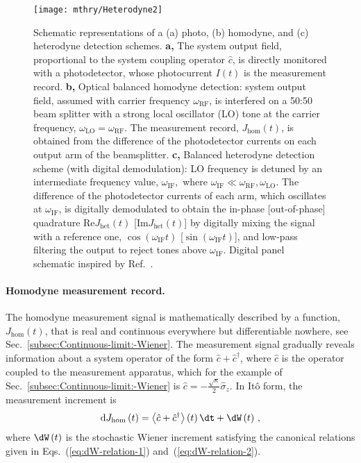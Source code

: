 \begin{figure}
\begin{centering}
\texttt{[image: mthry/Heterodyne2]}
\par\end{centering}
\caption[Schematic representations of a photo, homodyne, and heterodyne detection
schemes.]{\label{fig:Schematic-representation-of}Schematic representations
of a (a) photo, (b) homodyne, and (c) heterodyne detection schemes.
\textbf{a, }The system output field, proportional to the system coupling
operator $\hat{c}$, is directly monitored with a photodetector, whose
photocurrent $I\left(t\right)$ is the measurement record. \textbf{b,}
Optical balanced homodyne detection: system output field, assumed
with carrier frequency $\omega_{\mathrm{RF}}$, is interfered on a
50:50 beam splitter with a strong local oscillator (LO) tone at the
carrier frequency, $\omega_{\mathrm{LO}}=\omega_{\mathrm{RF}}$. The
measurement record, $J_{\mathrm{hom}}\left(t\right)$, is obtained
from the  difference of the photodetector currents on each output
arm of the beamsplitter. \textbf{c,} Balanced heterodyne detection
scheme (with digital demodulation): LO frequency is detuned by an
intermediate frequency value, $\omega_{\mathrm{IF}},$ where $\omega_{\mathrm{IF}}\ll\omega_{\mathrm{RF}},\omega_{\mathrm{LO}}$.
The difference of the photodetector currents of each arm, which oscillates
at $\omega_{\mathrm{IF}}$, is digitally demodulated to obtain the
in-phase {[}out-of-phase{]} quadrature $\mathrm{Re}J_{\mathrm{het}}\left(t\right)$
{[}$\mathrm{Im}J_{\mathrm{het}}\left(t\right)${]} by digitally mixing
the signal with a reference one, $\cos\left(\omega_{\mathrm{IF}}t\right)$
{[}$\sin\left(\omega_{\mathrm{IF}}t\right)${]}, and low-pass filtering
the output to reject tones above $\omega_{\mathrm{IF}}$. Digital
panel schematic inspired by Ref.~\citep{Campagne2016-Fluorescence}.
}
\end{figure}


\paragraph{Homodyne measurement record. }

The homodyne measurement signal is mathematically described by a function,
$J_{\mathrm{hom}}\left(t\right)$, that is real and continuous everywhere
but differentiable nowhere, see Sec.~\ref{subsec:Continuous-limit:-Wiener}.
The measurement signal gradually reveals information about a system
operator of the form $\hat{c}+\hat{c}^{\dagger}$, where $\hat{c}$
is the operator coupled to the measurement apparatus, which for the
example of Sec.~\ref{subsec:Continuous-limit:-Wiener} is $\hat{c}=-\frac{\sqrt{\kappa}}{2}\hat{\sigma}_{z}$.
In Itô form, the measurement increment is
\begin{equation}
\mathrm{d}J_{\mathrm{hom}}\left(t\right)=\left\langle \hat{c}+\hat{c}^{\dagger}\right\rangle \left(t\right)\dt+\dW\left(t\right)\,,\label{eq:Jhom}
\end{equation}
where $\dW\left(t\right)$ is the stochastic Wiener increment satisfying
the canonical relations given in Eqs.~(\ref{eq:dW-relation-1})
and~(\ref{eq:dW-relation-2}).

